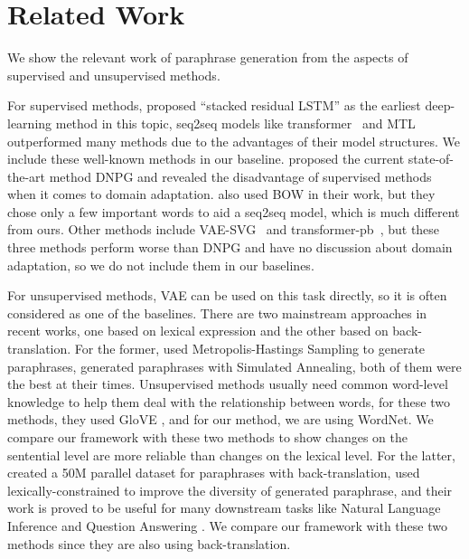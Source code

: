 \section{Related Work}
We show the relevant work of paraphrase generation from the aspects of supervised and unsupervised methods.

For supervised methods, \citet{prakash2016neural} proposed ``stacked residual LSTM'' as the earliest deep-learning method in this topic, seq2seq models like transformer~\citep{vaswani2017attention} and MTL~\citep{domhan2017using} outperformed many methods due to the advantages of their model structures. We include these well-known methods in our baseline.  \citet{li2019decomposable} proposed the current state-of-the-art method DNPG and revealed the disadvantage of supervised methods when it comes to domain adaptation. \citet{fu2019paraphrase} also used BOW in their work, but they chose only a few important words to aid a seq2seq model, which is much different from ours. Other methods include VAE-SVG~\citep{gupta2018deep} and transformer-pb~\citep{wang2019task}, but these three methods perform worse than DNPG and have no discussion about domain adaptation, so we do not include them in our baselines.

For unsupervised methods, VAE\citep{kingma2013auto} can be used on this task directly, so it is often considered as one of the baselines. There are two mainstream approaches in recent works, one based on lexical expression and the other based on back-translation. For the former, \citet{miao2019cgmh} used Metropolis-Hastings Sampling to generate paraphrases, \citet{liu2019unsupervised} generated paraphrases with Simulated Annealing, both of them were the best at their times. Unsupervised methods usually need common word-level knowledge to help them deal with the relationship between words, for these two methods, they used GloVE \citep{pennington2014glove}, and for our method, we are using WordNet. We compare our framework with these two methods to show changes on the sentential level are more reliable than changes on the lexical level. For the latter, \citet{wieting2017paranmt} created a 50M parallel dataset for paraphrases with back-translation, \citet{hu2019parabank} used lexically-constrained to improve the diversity of generated paraphrase, and their work is proved to be useful for many downstream tasks like Natural Language Inference and Question Answering \citep{hu2019improved}. We compare our framework with these two methods since they are also using back-translation.


